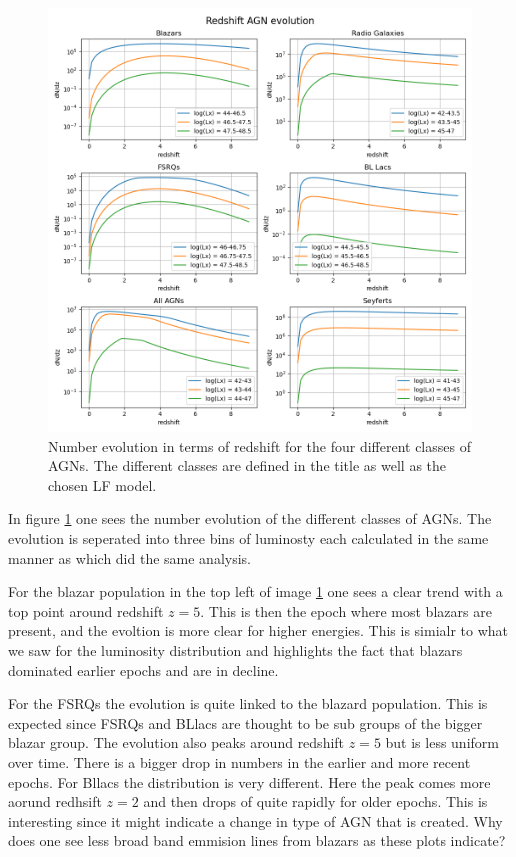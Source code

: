 \documentclass{article}
\begin{document}
\begin{figure}
    \centering
    \includegraphics[width = \textwidth]{new_plots/Redshift AGN evolution.png}
    \caption{Number evolution in terms of redshift for the four different classes of AGNs. The different classes are defined in the title as well as the chosen LF model.}
    \label{fig:ND}
\end{figure}



In figure \ref{fig:ND} one sees the number evolution of the different classes of AGNs. The evolution is seperated into three bins of luminosty each calculated in the same manner as \cite{Jacobsen:2015mga} which did the same analysis.

For the blazar population in the top left of image \ref{fig:ND} one sees a clear trend with a top point around redshift $z=5$. 
This is then the epoch where most blazars are present, and the evoltion is more clear for higher energies. This is simialr to what we saw for the luminosity distribution and highlights the fact that blazars dominated earlier epochs and are in decline. 


For the FSRQs the evolution is quite linked to the blazard population. This is expected since FSRQs and BLlacs are thought to be 
sub groups of the bigger blazar group. The evolution also peaks around redshift $z=5$ but is less uniform over time. There is a bigger drop 
in numbers in the earlier and more recent epochs. For Bllacs the distribution is very different. Here the peak comes more aorund redhsift $z=2$ and then drops of quite rapidly for older epochs.
This is interesting since it might indicate a change in type of AGN that is created. Why does one see less broad band emmision lines from blazars as these plots indicate? 
\end{document}
